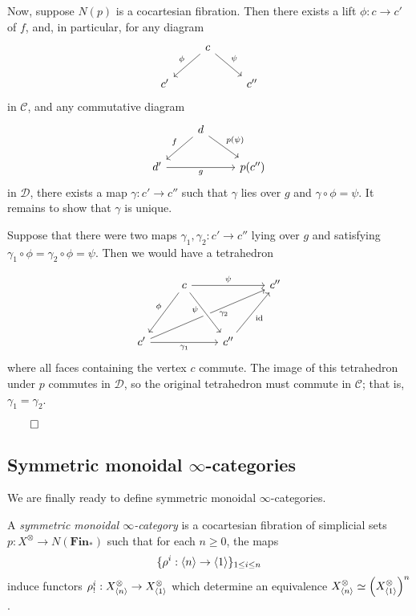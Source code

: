 \documentclass{MetricNotes2023}
\def\id{\ensuremath\text{id}}
\def\done{\begin{flushright}\vspace{-4.35ex}\(\qed\)\end{flushright}}
\begin{document}
\begin{ourproof}
Now, suppose \(N(p)\) is a cocartesian fibration. Then there exists a lift \(\phi : c \to c'\) of \(f\), and, in particular, for any diagram
\[\begin{tikzcd}
& c \arrow[dl, swap, "\phi"] \arrow[dr, "\psi"]  & \\
c'  & & c''
\end{tikzcd}\]
in \(\mathcal{C}\), and any commutative diagram
\[\begin{tikzcd}
& d \arrow[dl, swap, "f"] \arrow[dr, "p(\psi)"]  & \\
d' \arrow[rr, swap, "g"] & & p(c'')
\end{tikzcd}\]
in \(\mathcal{D}\), there exists a map \(\gamma : c'\to c''\) such that \(\gamma\) lies over \(g\) and \(\gamma \circ \phi = \psi\). It remains to show that \(\gamma\) is unique. 

Suppose that there were two maps \(\gamma_1, \gamma_2 : c' \to c''\) lying over \(g\) and satisfying \(\gamma_1\circ\phi = \gamma_2 \circ \phi = \psi\). Then we would have a tetrahedron 

\[\begin{tikzcd}
& c \arrow[rr, "\psi"] \arrow[ddl, swap, "\phi"]  & & c'' \\
& & & \\
c' \arrow[rr, swap, "\gamma_1"] \arrow[rrruu, swap, "\gamma_2" {xshift=8pt, yshift=5pt}] & & c'' \arrow[ruu, swap, "\id"] \arrow[from=luu, swap, crossing over, "\psi" {xshift=-4pt, yshift=8pt}] & 
\end{tikzcd}\]
where all faces containing the vertex \(c\) commute. The image of this tetrahedron under \(p\) commutes in \(\mathcal{D}\), so the original tetrahedron must commute in \(\mathcal{C}\); that is, \(\gamma_1=\gamma_2\).\done

\subsection{Symmetric monoidal \(\infty\)-categories}

We are finally ready to define symmetric monoidal \(\infty\)-categories.

\begin{definition}
A \textit{symmetric monoidal \(\infty\)-category} is a cocartesian fibration of simplicial sets \(p : X^\otimes \to N(\textbf{Fin}_*)\) such that for each \(n \geq 0\), the maps 
\[\{\rho^i : \langle n\rangle\to \langle1\rangle\}_{1 \leq i \leq n}\] 
induce functors \(\rho^i_! : X^\otimes_{\langle n\rangle}\to X^\otimes_{\langle1\rangle}\) which determine an equivalence \(X^\otimes_{\langle n\rangle}\simeq \left(X^\otimes_{\langle1\rangle}\right)^n\). 
\end{definition}


\end{ourproof}
\end{document}
